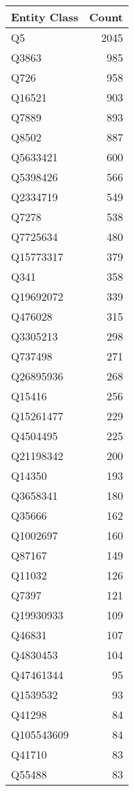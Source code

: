 \begin{tabular}{lr}
\toprule
Entity Class &  Count \\
\midrule
          Q5 &   2045 \\
       Q3863 &    985 \\
        Q726 &    958 \\
      Q16521 &    903 \\
       Q7889 &    893 \\
       Q8502 &    887 \\
    Q5633421 &    600 \\
    Q5398426 &    566 \\
    Q2334719 &    549 \\
       Q7278 &    538 \\
    Q7725634 &    480 \\
   Q15773317 &    379 \\
        Q341 &    358 \\
   Q19692072 &    339 \\
     Q476028 &    315 \\
    Q3305213 &    298 \\
     Q737498 &    271 \\
   Q26895936 &    268 \\
      Q15416 &    256 \\
   Q15261477 &    229 \\
    Q4504495 &    225 \\
   Q21198342 &    200 \\
      Q14350 &    193 \\
    Q3658341 &    180 \\
      Q35666 &    162 \\
    Q1002697 &    160 \\
      Q87167 &    149 \\
      Q11032 &    126 \\
       Q7397 &    121 \\
   Q19930933 &    109 \\
      Q46831 &    107 \\
    Q4830453 &    104 \\
   Q47461344 &     95 \\
    Q1539532 &     93 \\
      Q41298 &     84 \\
  Q105543609 &     84 \\
      Q41710 &     83 \\
      Q55488 &     83 \\

\end{tabular}
